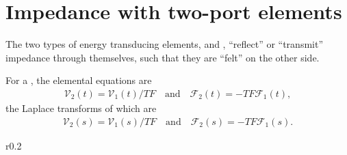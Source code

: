 \documentclass[dynamic_systems.tex]{subfiles}
\begin{document}
\section{Impedance with two-port elements}
\tags{}

The two types of energy transducing elements,  and , ``reflect'' or ``transmit'' impedance through themselves, such that they are ``felt'' on the other side.
\tags{}

For a , the elemental equations are
\begin{align}
	\mathcal{V}_2(t) = \mathcal{V}_1(t)/TF
	\quad
	\text{and}
	\quad
	\mathcal{F}_2(t) = -TF \mathcal{F}_1(t),
\end{align}
the Laplace transforms of which are
\begin{align} \label{eq:transformer_laplace}
	\mathcal{V}_2(s) = \mathcal{V}_1(s)/TF
	\quad
	\text{and}
	\quad
	\mathcal{F}_2(s) = -TF \mathcal{F}_1(s).
\end{align}

\begin{wrapfigure}[7]{r}{0.2\textwidth}
\centering
{}
\caption{}
\label{fig:transformer_impedance}
\end{wrapfigure}
\end{document}
